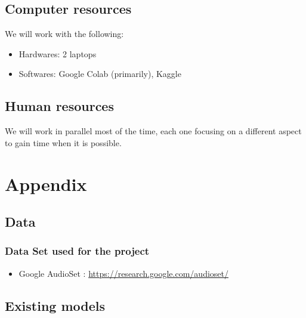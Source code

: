 \documentclass[11pt]{article}
\begin{document}
\subsection{Computer resources}

We will work with the following:
\begin{itemize}
  \item Hardwares: 2 laptops 
  \item Softwares: Google Colab (primarily), Kaggle
\end{itemize}

\subsection{Human resources}

We will work in parallel most of the time, each one focusing on a different aspect to gain time when it is possible.

\pagebreak

\section{Appendix}

\subsection{Data}

\subsubsection*{Data Set used for the project}

\begin{itemize}
  \item Google AudioSet : \url{https://research.google.com/audioset/}
        \label{item:google-audioset}
\end{itemize}

\subsection{Existing models}
\end{document}
